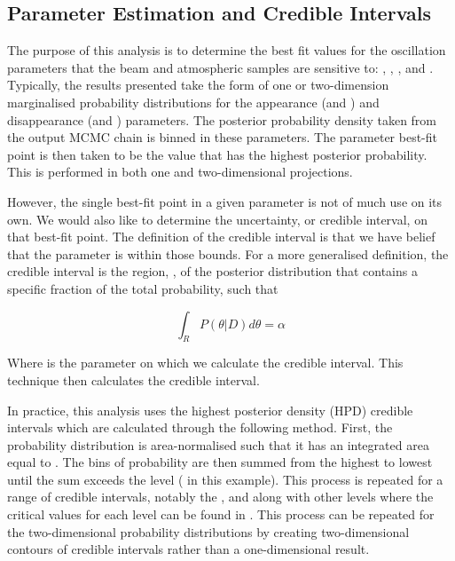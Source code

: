 \subsection{Parameter Estimation and Credible Intervals}
\label{sec:MarkovChainMonteCarlo_ParameterEstimation}

The purpose of this analysis is to determine the best fit values for the oscillation parameters that the beam and atmospheric samples are sensitive to: \sinsqatm, \sinsqreac, \delmsqatm, and \dcp. Typically, the results presented take the form of one or two-dimension marginalised probability distributions for the appearance (\sinsqreac and \dcp) and disappearance (\sinsqatm and \delmsqatm) parameters. The posterior probability density taken from the output MCMC chain is binned in these parameters. The parameter best-fit point is then taken to be the value that has the highest posterior probability. This is performed in both one and two-dimensional projections.

However, the single best-fit point in a given parameter is not of much use on its own. We would also like to determine the uncertainty, or credible interval, on that best-fit point. The definition of the \quickmath{1\sigma} credible interval is that we have  belief that the parameter is within those bounds. For a more generalised definition, the credible interval is the region, , of the posterior distribution that contains a specific fraction of the total probability, such that

\begin{equation}
\int_{R} P(\theta|D)d\theta = \alpha
\end{equation}

Where \quickmath{\theta} is the parameter on which we calculate the credible interval. This technique then calculates the  credible interval.

In practice, this analysis uses the highest posterior density (HPD) credible intervals which are calculated through the following method. First, the probability distribution is area-normalised such that it has an integrated area equal to . The bins of probability are then summed from the highest to lowest until the sum exceeds the \quickmath{1\sigma} level ( in this example). This process is repeated for a range of credible intervals, notably the \quickmath{1\sigma}, \quickmath{2\sigma} and \quickmath{3\sigma} along with other levels where the critical values for each level can be found in \cite{Particle_Data_Group2020-ms}. This process can be repeated for the two-dimensional probability distributions by creating two-dimensional contours of credible intervals rather than a one-dimensional result. 

